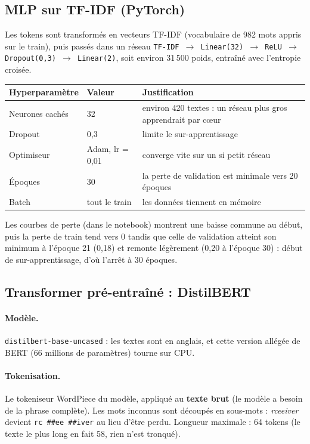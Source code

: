 \documentclass[11pt,a4paper]{article}
\begin{document}
\subsection{MLP sur TF-IDF (PyTorch)}

Les tokens sont transformés en vecteurs TF-IDF (vocabulaire de 982 mots appris sur le train), puis passés dans un réseau \texttt{TF-IDF $\to$ Linear(32) $\to$ ReLU $\to$ Dropout(0,3) $\to$ Linear(2)}, soit environ 31\,500 poids, entraîné avec l'entropie croisée.

\begin{center}
\small
\begin{tabular}{llp{8.5cm}}
\toprule
Hyperparamètre & Valeur & Justification \\
\midrule
Neurones cachés & 32 & environ 420 textes : un réseau plus gros apprendrait par cœur \\
Dropout & 0,3 & limite le sur-apprentissage \\
Optimiseur & Adam, lr = 0,01 & converge vite sur un si petit réseau \\
Époques & 30 & la perte de validation est minimale vers 20 époques \\
Batch & tout le train & les données tiennent en mémoire \\
\bottomrule
\end{tabular}
\end{center}

Les courbes de perte (dans le notebook) montrent une baisse commune au début, puis la perte de train tend vers 0 tandis que celle de validation atteint son minimum à l'époque 21 (0,18) et remonte légèrement (0,20 à l'époque 30) : début de sur-apprentissage, d'où l'arrêt à 30 époques.

\subsection{Transformer pré-entraîné : DistilBERT}

\paragraph{Modèle.} \texttt{distilbert-base-uncased} : les textes sont en anglais, et cette version allégée de BERT (66 millions de paramètres) tourne sur CPU.

\paragraph{Tokenisation.} Le tokeniseur WordPiece du modèle, appliqué au \textbf{texte brut} (le modèle a besoin de la phrase complète). Les mots inconnus sont découpés en sous-mots : \emph{rceeiver} devient \texttt{rc \#\#ee \#\#iver} au lieu d'être perdu. Longueur maximale : 64 tokens (le texte le plus long en fait 58, rien n'est tronqué).
\end{document}
